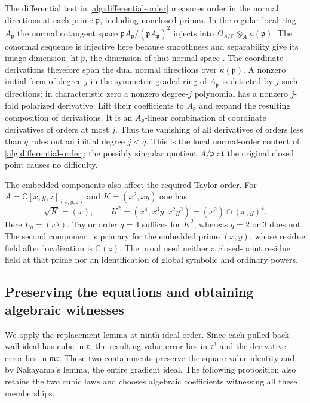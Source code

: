 \begin{remark}
\label{alg:embedded-example}
The differential test in \eqref{alg:differential-order} measures order
in the normal directions at each prime $\mathfrak p$, including
nonclosed primes. In the regular local ring $A_{\mathfrak p}$ the normal
cotangent space
$\mathfrak pA_{\mathfrak p}/(\mathfrak pA_{\mathfrak p})^2$
injects into $\Omega_{A/\mathbb C}\otimes_A\kappa(\mathfrak p)$.
The conormal sequence is injective here because smoothness and
separability give its image dimension $\operatorname{ht}\mathfrak p$,
the dimension of that normal space
\cite[Tags 00TT, 00NO, and 00TU]{Stacks}. The coordinate derivations
therefore span the dual normal directions over $\kappa(\mathfrak p)$.
A nonzero initial form of degree $j$ in the symmetric graded ring of
$A_{\mathfrak p}$ is detected by $j$ such directions: in characteristic
zero a nonzero degree-$j$ polynomial has a nonzero $j$-fold polarized
derivative. Lift their coefficients to $A_{\mathfrak p}$ and expand
the resulting composition of derivations. It is an
$A_{\mathfrak p}$-linear combination of coordinate derivatives of
orders at most $j$. Thus the vanishing of all derivatives of orders
less than $q$ rules out an initial degree $j<q$. This is the local
normal-order content of \eqref{alg:differential-order}; the possibly
singular quotient $A/\mathfrak p$ at the original closed point causes
no difficulty.

The embedded components also affect the required Taylor order.
For $A=\mathbb C[x,y,z]_{(x,y,z)}$ and $K=(x^2,xy)$ one has
\[
 \sqrt K=(x),\qquad
 K^2=(x^4,x^3y,x^2y^2)=(x^2)\cap(x,y)^4.
\]
Here $L_q=(x^q)$. Taylor order $q=4$ suffices for $K^2$, whereas
$q=2$ or $3$ does not. The second component is primary for the embedded
prime $(x,y)$, whose residue field after localization is $\mathbb C(z)$.
The proof used neither a closed-point residue field at that prime nor
an identification of global symbolic and ordinary powers.
\end{remark}

\subsection{Preserving the equations and obtaining algebraic witnesses}

We apply the replacement lemma at ninth ideal order. Since each
pulled-back wall ideal has cube in $\mathfrak r$, the resulting value
error lies in $\mathfrak r^3$ and the derivative error lies in
$\mathfrak m\mathfrak r$. These two containments preserve the
square-value identity and, by Nakayama's lemma, the entire gradient
ideal. The following proposition also retains the two cubic laws and
chooses algebraic coefficients witnessing all these memberships.

